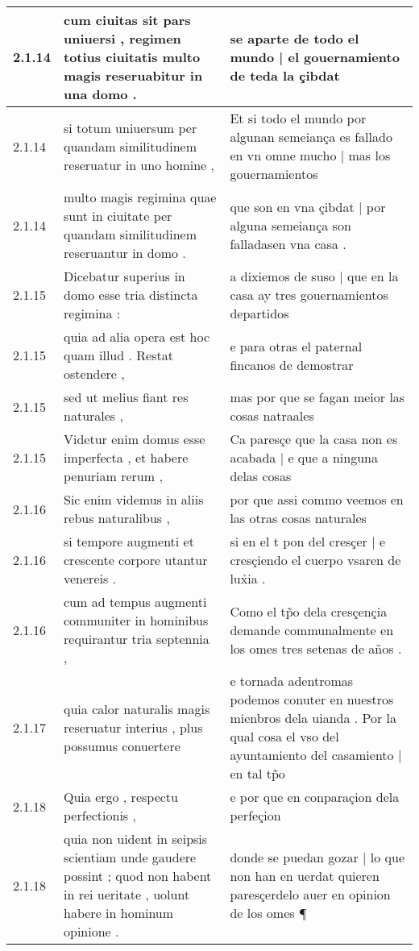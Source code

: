 \begin{tabular}{|p{1cm}|p{6.5cm}|p{6.5cm}|}
2.1.14 & cum ciuitas sit pars uniuersi , regimen totius ciuitatis multo magis reseruabitur in una domo . & se aparte de todo el mundo | el gouernamiento de teda la çibdat \\\hline
2.1.14 & si totum uniuersum per quandam similitudinem reseruatur in uno homine , & Et si todo el mundo por algunan semeiança es fallado en vn omne mucho | mas los gouernamientos \\\hline
2.1.14 & multo magis regimina quae sunt in ciuitate per quandam similitudinem reseruantur in domo . & que son en vna çibdat | por alguna semeiança son falladasen vna casa . \\\hline
2.1.15 & Dicebatur superius in domo esse tria distincta regimina : & a dixiemos de suso | que en la casa ay tres gouernamientos departidos \\\hline
2.1.15 & quia ad alia opera est hoc quam illud . Restat ostendere , & e para otras el paternal fincanos de demostrar \\\hline
2.1.15 & sed ut melius fiant res naturales , & mas por que se fagan meior las cosas natraales \\\hline
2.1.15 & Videtur enim domus esse imperfecta , et habere penuriam rerum , & Ca paresçe que la casa non es acabada | e que a ninguna delas cosas \\\hline
2.1.16 & Sic enim videmus in aliis rebus naturalibus , & por que assi commo veemos en las otras cosas naturales \\\hline
2.1.16 & si tempore augmenti et crescente corpore utantur venereis . & si en el t pon del cresçer | e cresçiendo el cuerpo vsaren de lux̉ia . \\\hline
2.1.16 & cum ad tempus augmenti communiter in hominibus requirantur tria septennia , & Como el tp̃o dela cresçençia demande communalmente en los omes tres setenas de años . \\\hline
2.1.17 & quia calor naturalis magis reseruatur interius , plus possumus conuertere & e tornada adentromas podemos conuter en nuestros mienbros dela uianda . Por la qual cosa el vso del ayuntamiento del casamiento | en tal tp̃o \\\hline
2.1.18 & Quia ergo , respectu perfectionis , & e por que en conparaçion dela perfeçion \\\hline
2.1.18 & quia non uident in seipsis scientiam unde gaudere possint ; quod non habent in rei ueritate , uolunt habere in hominum opinione . & donde se puedan gozar | lo que non han en uerdat quieren paresçerdelo auer en opinion de los omes ¶ \\\hline

\end{tabular}
